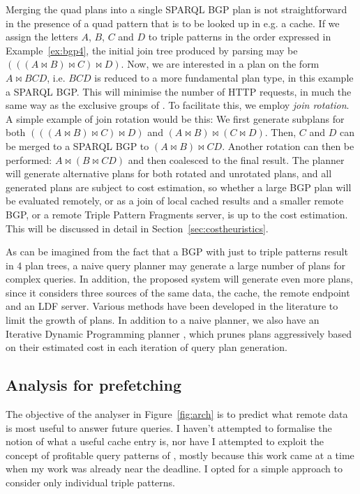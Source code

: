 Merging the quad plans into a single SPARQL BGP plan is not
straightforward in the presence of a quad pattern that is to be looked
up in e.g. a cache. If we assign the letters $A$, $B$, $C$ and $D$ to
triple patterns in the order expressed in
Example~\ref{ex:bgp4}, the initial join tree produced by parsing may
be $ (((A \bowtie B )\bowtie C) \bowtie D) $. Now, we are interested in
a plan on the form $A \bowtie BCD$, i.e. $BCD$ is reduced to a more
fundamental plan type, in this example a SPARQL BGP. This will
minimise the number of HTTP requests, in much the same way as the
exclusive groups of
\cite{springerlink:10.1007/978-3-642-25073-6-38}. To facilitate this,
we employ \emph{join rotation}. A simple example of join rotation
would be this: We first generate subplans for both $(((A \bowtie B
)\bowtie C) \bowtie D) $ and $ (A \bowtie B )\bowtie (C \bowtie D)
$. Then, $C$ and $D$ can be merged to a SPARQL BGP to $ (A \bowtie B
)\bowtie CD $. Another rotation can then be performed: $ A \bowtie (B
\bowtie CD) $ and then coalesced to the final result. The planner will
generate alternative plans for both rotated and unrotated plans, and
all generated plans are subject to cost estimation, so whether a large
BGP plan will be evaluated remotely, or as a join of local cached
results and a smaller remote BGP, or a remote Triple Pattern Fragments
server, is up to the cost estimation. This will be discussed in detail
in Section~\ref{sec:costheuristics}.

As can be imagined from the fact that a BGP with just to triple
patterns result in 4 plan trees, a naive query planner may generate a
large number of plans for complex queries. In addition, the proposed
system will generate even more plans, since it considers three sources
of the same data, the cache, the remote endpoint and an LDF
server. Various methods have been developed in the literature to limit
the growth of plans. In addition to a naive planner, we also have an
Iterative Dynamic Programming planner
\cite{Kossmann:2000:IDP:352958.352982}, which prunes plans
aggressively based on their estimated cost in each iteration of query
plan generation.

\subsection{Analysis for prefetching}\label{sec:analpre}

The objective of the analyser in Figure~\ref{fig:arch} is to predict
what remote data is most useful to answer future queries. I haven't
attempted to formalise the notion of what a useful cache entry is, nor
have I attempted to exploit the concept of profitable query patterns
of \cite{papailiou2015graph}, mostly because this work came at a time
when my work was already near the deadline. I opted for a simple
approach to consider only individual triple patterns.

